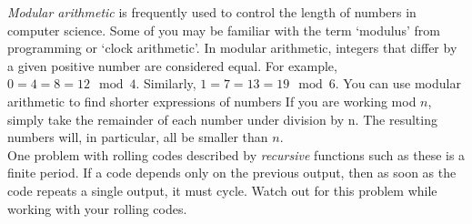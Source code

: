 \emph{Modular arithmetic} is frequently used to control the length of numbers in computer science. Some of you may be familiar with the term `modulus' from programming or `clock arithmetic'. In modular arithmetic, integers that differ by a given positive number are considered equal. For example, $0 = 4 = 8 = 12 \mod 4$. Similarly, $1 = 7 = 13 = 19 \mod 6$. You can use modular arithmetic to find shorter expressions of numbers If you are working mod $n$, simply take the remainder of each number under division by n. The resulting numbers will, in particular, all be smaller than $n$. \\

One problem with rolling codes described by \emph{recursive} functions such as these is a finite period. If a code depends only on the previous output, then as soon as the code repeats a single output, it must cycle. Watch out for this problem while working with your rolling codes. \\

 \vspace{0.2cm}

 \vspace{0.2cm}


